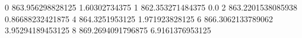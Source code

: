 0 863.956298828125 1.60302734375
1 862.353271484375 0.0
2 863.2201538085938 0.86688232421875
4 864.3251953125 1.971923828125
6 866.3062133789062 3.95294189453125
8 869.2694091796875 6.9161376953125

